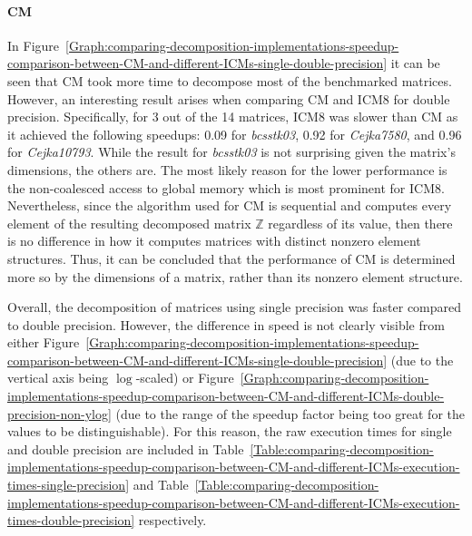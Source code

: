 \paragraph{CM}\label{Paragraph:comparing-decomposition-implementations-speedup-comparison-between-CM-and-different-ICMs-CM-speedup-description}
In Figure~\ref{Graph:comparing-decomposition-implementations-speedup-comparison-between-CM-and-different-ICMs-single-double-precision} it can be seen that CM took more time to decompose most of the benchmarked matrices. However, an interesting result arises when comparing CM and ICM8 for double precision. Specifically, for 3 out of the 14 matrices, ICM8 was slower than CM as it achieved the following speedups: 0.09 for \textit{bcsstk03}, 0.92 for \textit{Cejka7580}, and 0.96 for \textit{Cejka10793}. While the result for \textit{bcsstk03} is not surprising given the matrix's dimensions, the others are. The most likely reason for the lower performance is the non-coalesced access to global memory which is most prominent for ICM8. \\
Nevertheless, since the algorithm used for CM is sequential and computes every element of the resulting decomposed matrix $ \mathbb{Z} $ regardless of its value, then there is no difference in how it computes matrices with distinct nonzero element structures. Thus, it can be concluded that the performance of CM is determined more so by the dimensions of a matrix, rather than its nonzero element structure.
\par Overall, the decomposition of matrices using single precision was faster compared to double precision. However, the difference in speed is not clearly visible from either Figure~\ref{Graph:comparing-decomposition-implementations-speedup-comparison-between-CM-and-different-ICMs-single-double-precision} (due to the vertical axis being $ \log $-scaled) or Figure~\ref{Graph:comparing-decomposition-implementations-speedup-comparison-between-CM-and-different-ICMs-double-precision-non-ylog} (due to the range of the speedup factor being too great for the values to be distinguishable). For this reason, the raw execution times for single and double precision are included in Table~\ref{Table:comparing-decomposition-implementations-speedup-comparison-between-CM-and-different-ICMs-execution-times-single-precision} and Table~\ref{Table:comparing-decomposition-implementations-speedup-comparison-between-CM-and-different-ICMs-execution-times-double-precision} respectively.

